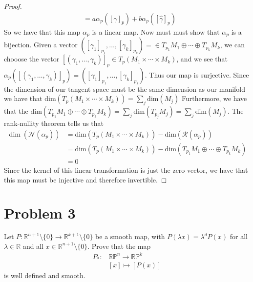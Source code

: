 \documentclass[a4paper]{article}
\begin{document}
\begin{proof}
\[\begin{aligned}
                                               &= a\alpha_p([\gamma]_p) + b \alpha_p([\hat{\gamma}]_p)
    \end{aligned}
  \]
  So we have that this map $\alpha_p$ is a linear map. Now must must show that $\alpha_p$ is a bijection. Given a vector $([\gamma_1]_{p_1}, \dots, [\gamma_k]_{p_k}) = \in T_{p_1}M_1 \oplus \cdots \oplus T_{p_k}M_k$, we can chooose the vector $[(\gamma_1, \dots, \gamma_k)]_p \in T_p(M_1 \times \cdots \times M_k)$, and we see that $\alpha_p([(\gamma_1, \dots, \gamma_k)]_p) = ([\gamma_1]_{p_1}, \dots, [\gamma_k]_{p_k})$. Thus our map is surjective. Since the dimension of our tangent space must be the same dimension as our manifold we have that 
  $\text{dim}\left(T_p(M_1 \times \cdots \times M_k)\right) = \sum_j \text{dim}(M_j)$ Furthermore, we have that the $\text{dim} \left( T_{p_1}M_1 \oplus \cdots \oplus T_{p_k}M_k \right) = \sum_j \text{dim}(T_{p_j}M_j) = \sum_j \text{dim}(M_j)$. The rank-nullity theorem tells us that 
\[
  \begin{aligned}
    \dim\left(\mathcal{N}(\alpha_p)\right) &= \text{dim}\left(T_p(M_1 \times \cdots \times M_k)\right)  - \text{dim}\left(\mathcal{R}(\alpha_p)\right) \\
                                           &=  \text{dim}\left(T_p(M_1 \times \cdots \times M_k)\right)  - \text{dim} \left( T_{p_1}M_1 \oplus \cdots \oplus T_{p_k}M_k \right) \\
                                           &= 0
  \end{aligned}
\]
Since the kernel of this linear transformation is just the zero vector, we have that this map must be injective and therefore invertible.

\end{proof}

\section*{Problem 3}%
Let $P: \mathds{R}^{n+1} \setminus \{0\} \rightarrow \mathds{R}^{k+1} \setminus \{0\}$ be a smooth map, with $P(\lambda x) = \lambda^dP(x)$ for all $\lambda \in \mathds{R}$ and all $x \in \mathds{R}^{n+1} \setminus \{0\}$. Prove that the map 
\[
  \begin{aligned}
    P_{*}: &\mathds{RP}^n \rightarrow \mathds{RP}^k \\
           &[x] \mapsto [P(x)]
  \end{aligned}
\]
is well defined and smooth.
\end{document}
